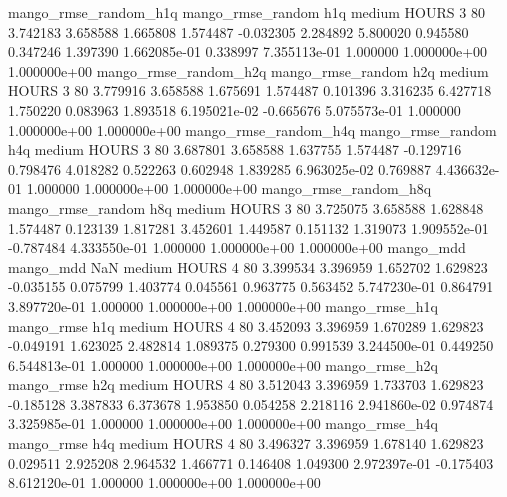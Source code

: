 mango_rmse_random_h1q mango_rmse_random                  h1q     medium    HOURS                 3 80  3.742183       3.658588 1.665808       1.574487   -0.032305      2.284892      5.800020     0.945580       0.347246  1.397390 1.662085e-01     0.338997   7.355113e-01            1.000000    1.000000e+00        1.000000e+00
mango_rmse_random_h2q mango_rmse_random                  h2q     medium    HOURS                 3 80  3.779916       3.658588 1.675691       1.574487    0.101396      3.316235      6.427718     1.750220       0.083963  1.893518 6.195021e-02    -0.665676   5.075573e-01            1.000000    1.000000e+00        1.000000e+00
mango_rmse_random_h4q mango_rmse_random                  h4q     medium    HOURS                 3 80  3.687801       3.658588 1.637755       1.574487   -0.129716      0.798476      4.018282     0.522263       0.602948  1.839285 6.963025e-02     0.769887   4.436632e-01            1.000000    1.000000e+00        1.000000e+00
mango_rmse_random_h8q mango_rmse_random                  h8q     medium    HOURS                 3 80  3.725075       3.658588 1.628848       1.574487    0.123139      1.817281      3.452601     1.449587       0.151132  1.319073 1.909552e-01    -0.787484   4.333550e-01            1.000000    1.000000e+00        1.000000e+00
            mango_mdd         mango_mdd                  NaN     medium    HOURS                 4 80  3.399534       3.396959 1.652702       1.629823   -0.035155      0.075799      1.403774     0.045561       0.963775  0.563452 5.747230e-01     0.864791   3.897720e-01            1.000000    1.000000e+00        1.000000e+00
       mango_rmse_h1q        mango_rmse                  h1q     medium    HOURS                 4 80  3.452093       3.396959 1.670289       1.629823   -0.049191      1.623025      2.482814     1.089375       0.279300  0.991539 3.244500e-01     0.449250   6.544813e-01            1.000000    1.000000e+00        1.000000e+00
       mango_rmse_h2q        mango_rmse                  h2q     medium    HOURS                 4 80  3.512043       3.396959 1.733703       1.629823   -0.185128      3.387833      6.373678     1.953850       0.054258  2.218116 2.941860e-02     0.974874   3.325985e-01            1.000000    1.000000e+00        1.000000e+00
       mango_rmse_h4q        mango_rmse                  h4q     medium    HOURS                 4 80  3.496327       3.396959 1.678140       1.629823    0.029511      2.925208      2.964532     1.466771       0.146408  1.049300 2.972397e-01    -0.175403   8.612120e-01            1.000000    1.000000e+00        1.000000e+00
